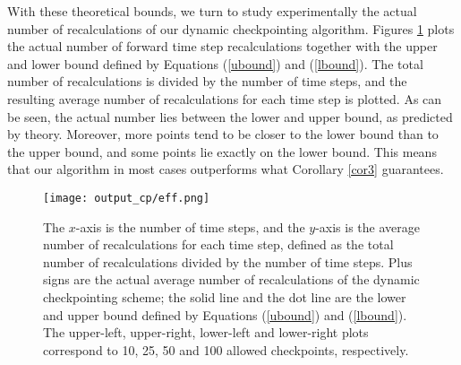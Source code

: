 With these theoretical bounds, we turn to study experimentally the actual
number of recalculations of our dynamic checkpointing algorithm.
Figures \ref{fig_eff} plots the actual number of forward time step
recalculations together with the upper and lower bound defined by Equations
(\ref{ubound}) and (\ref{lbound}).  The total number of recalculations
is divided by the number of time steps, and the resulting average number of
recalculations for each time step is plotted.  As can be seen, the actual
number lies between the lower and upper bound, as predicted by theory.
Moreover, more points tend to be closer to the lower bound than to the upper
bound, and some points lie exactly on the lower bound.  This means that our
algorithm in most cases outperforms what Corollary \ref{cor3} guarantees.
\begin{figure}[htb!] \center
\texttt{[image: output\_cp/eff.png]}
\caption{The $x$-axis is the number of time steps, and the $y$-axis is the
average number of recalculations for each time step,
defined as the total number of recalculations divided by the number
of time steps.  Plus signs are the actual average number of recalculations
of the dynamic checkpointing scheme; the solid line and the dot line are the
lower and upper bound defined by Equations (\ref{ubound}) and (\ref{lbound}).
The upper-left, upper-right, lower-left and lower-right plots correspond to
10, 25, 50 and 100 allowed checkpoints, respectively.}
 \label{fig_eff}
\end{figure}

